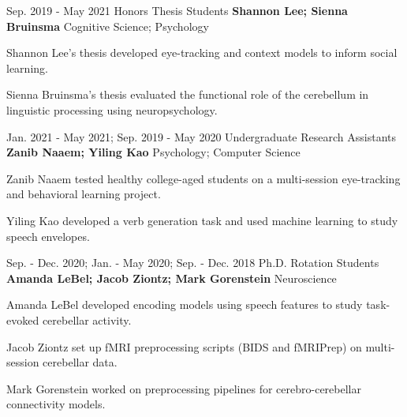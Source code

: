 

\begin{cventries}

 
  \cventry
    {Sep. 2019 - May 2021} %
    {Honors Thesis Students} %
    {\textbf{Shannon Lee; Sienna Bruinsma}} 
    {Cognitive Science; Psychology} %
    {
      \begin{cvitems} %
        \item {Shannon Lee's thesis developed eye-tracking and context models to inform social learning.}
        \item {Sienna Bruinsma's thesis evaluated the functional role of the cerebellum in linguistic processing using neuropsychology.}
      \end{cvitems}
    }
    
    
  \cventry
    {Jan. 2021 - May 2021; Sep. 2019 - May 2020} %
    {Undergraduate Research Assistants} %
   	{\textbf{Zanib Naaem; Yiling Kao}}
   	{Psychology; Computer Science}
    {
      \begin{cvitems} %
        \item {Zanib Naaem tested healthy college-aged students on a multi-session eye-tracking and behavioral learning project.}
        \item {Yiling Kao developed a verb generation task and used machine learning to study speech envelopes.}
      \end{cvitems}
    }
    
  \cventry
    {Sep. - Dec. 2020; Jan. - May 2020; Sep. - Dec. 2018} %
    {Ph.D. Rotation Students} %
    {\textbf{Amanda LeBel; Jacob Ziontz; Mark Gorenstein}}
    {Neuroscience}
   {
      \begin{cvitems} %
        \item {Amanda LeBel developed encoding models using speech features to study task-evoked cerebellar activity.}
        \item {Jacob Ziontz set up fMRI preprocessing scripts (BIDS and fMRIPrep) on multi-session cerebellar data.}
        \item {Mark Gorenstein worked on preprocessing pipelines for cerebro-cerebellar connectivity models.}
      \end{cvitems}
    }
    

\end{cventries}
